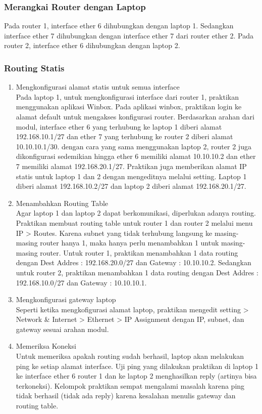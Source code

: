 \subsubsection{Merangkai Router dengan Laptop}
Pada router 1, interface ether 6 dihubungkan dengan laptop 1. Sedangkan interface ether 7 dihubungkan dengan interface ether 7 dari router ether 2. Pada router 2, interface ether 6 dihubungkan dengan laptop 2. 

\subsubsection{Routing Statis}
\begin{enumerate}
  \item Mengkonfigurasi alamat statis untuk semua interface\\
  Pada laptop 1, untuk mengkonfigurasi interface dari router 1, praktikan menggunakan aplikasi Winbox. Pada aplikasi winbox, praktikan login ke alamat default untuk mengakses konfigurasi router. Berdasarkan arahan dari modul, interface ether 6 yang terhubung ke laptop 1 diberi alamat 192.168.10.1/27 dan ether 7 yang terhubung ke router 2 diberi alamat 10.10.10.1/30. dengan cara yang sama menggunakan laptop 2, router 2 juga dikonfigurasi sedemikian hingga ether 6 memiliki alamat 10.10.10.2 dan ether 7 memiliki alamat 192.168.20.1/27. Praktikan juga memberikan alamat IP statis untuk laptop 1 dan 2 dengan mengeditnya melalui setting. Laptop 1 diberi alamat 192.168.10.2/27 dan laptop 2 diberi alamat 192.168.20.1/27.
  \item Menambahkan Routing Table \\
  Agar laptop 1 dan laptop 2 dapat berkomunikasi, diperlukan adanya routing. Praktikan membuat routing table untuk router 1 dan router 2 melalui menu IP > Routes. Karena subnet yang tidak terhubung langsung ke masing-masing router hanya 1, maka hanya perlu menambahkan 1 untuk masing-masing router. Untuk router 1, praktikan menambahkan 1 data routing dengan Dest Addres : 192.168.20.0/27 dan Gateway : 10.10.10.2. Sedangkan untuk router 2, praktikan menambahkan 1 data routing dengan Dest Addres : 192.168.10.0/27 dan Gateway : 10.10.10.1. 
  \item Mengkonfigurasi gateway laptop \\
  Seperti ketika mengkofigurasi alamat laptop, praktikan mengedit setting > Network \& Internet > Ethernet > IP Assignment dengan IP, subnet, dan gateway sesuai arahan modul. 
  \item Memeriksa Koneksi \\
  Untuk memeriksa apakah routing sudah berhasil, laptop akan melakukan ping ke setiap alamat interface. Uji ping yang dilakukan praktikan di laptop 1 ke interface ether 6 router 1 dan ke laptop 2 menghasilkan reply (artinya bisa terkoneksi). Kelompok praktikan sempat mengalami masalah karena ping tidak berhasil (tidak ada reply) karena kesalahan menulis gateway dan routing table.
\end{enumerate}

